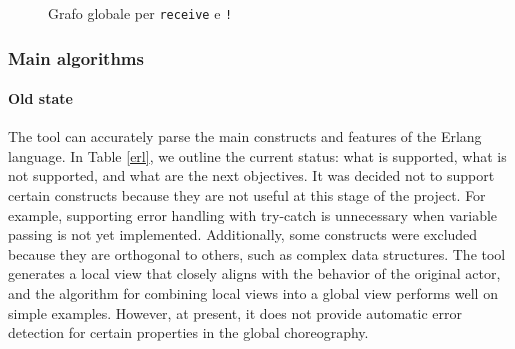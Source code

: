 \bigskip

\begin{figure}[ht!]
    \centering
    \caption{Grafo globale per \texttt{receive} e \texttt{!}}
    \label{grafo:sendrecv}
\end{figure}


\subsubsection{Main algorithms}


\paragraph{Old state}

The tool can accurately parse the main constructs and features of the Erlang language. In Table \ref{erl}, we outline the current status: what is supported, what is not supported, and what are the next objectives. It was decided not to support certain constructs because they are not useful at this stage of the project. For example, supporting error handling with try-catch is unnecessary when variable passing is not yet implemented. Additionally, some constructs were excluded because they are orthogonal to others, such as complex data structures. The tool generates a local view that closely aligns with the behavior of the original actor, and the algorithm for combining local views into a global view performs well on simple examples. However, at present, it does not provide automatic error detection for certain properties in the global choreography.

